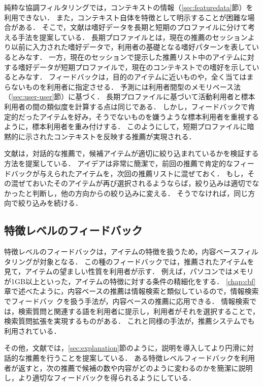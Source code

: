 純粋な協調フィルタリングでは，コンテキストの情報（\ref{sec:featuredata}節）を利用できない．
また，コンテキスト自体を特徴として明示することが困難な場合がある．
そこで，文献\cite{ej:051}は嗜好データを長期と短期のプロファイルに分けて考える手法を提案している．
長期プロファイルとは，現在の推薦のセッションより以前に入力された嗜好データで，利用者の基礎となる嗜好パターンを表しているとみなす．
一方，現在のセッションで提示した推薦リスト中のアイテムに対する嗜好データが短期プロファイルで，現在のコンテキストでの嗜好を示しているとみなす．
フィードバックは，目的のアイテムに近いものや，全く当てはまらないものを利用者に指定させる．
予測には利用者間型のメモリベース法（\ref{sec:user-user}節）に基づく．
長期プロファイルに基づいて活動利用者と標本利用者の間の類似度を計算する点は同じである．
しかし，フィードバックで肯定的だったアイテムを好み，そうでないものを嫌うような標本利用者を重視するように，標本利用者を重み付けする．
このようにして，短期プロファイルに暗黙的に示されたコンテキストを反映する推薦が実現される．

文献\cite{ijcai:03:04}は，対話的な推薦で，候補アイテムが適切に絞り込まれているかを検証する方法を提案している．
アイデアは非常に簡潔で，前回の推薦で肯定的なフィードバックが与えられたアイテムを，次回の推薦リストに混ぜておく．
もし，その混ぜておいたそのアイテムが再び選択されるようならば，絞り込みは適切でなかったと判断し，他の方向からの絞り込みに変える．
そうでなければ，同じ方向で絞り込みを続ける．

\subsection{特徴レベルのフィードバック}

特徴レベルのフィードバックは，アイテムの特徴を扱うため，内容ベースフィルタリングが対象となる．
この種のフィードバックでは，推薦されたアイテムを見て，アイテムの望ましい性質を利用者が示す．
例えば，パソコンではメモリが1GB以上といった，アイテムの特徴に対する条件の精細化をする．
\ref{chap:cbf}章で述べたように，内容ベースの推薦は情報検索と類似しているので，情報検索でフィードバッ
クを扱う手法が，内容ベースの推薦に応用できる．
情報検索では，検索質問と関連する語を利用者に提示し，利用者がそれを選択することで，検索質問拡張を実現するものがある．
これと同様の手法が，推薦システムでも利用されている\cite{ec:024}．

その他，文献\cite{ej:049}では，\ref{sec:explanation}節のように，説明を導入してより円滑に対話的な推薦を行うことを提案している．
ある特徴レベルフィードバックを利用者が返すと，次の推薦で候補の数や内容がどのように変わるのかを簡潔に説明し，より適切なフィードバックを得られるようにしている．

